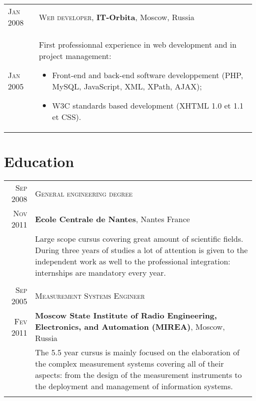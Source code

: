 \documentclass[letter,10pt]{article} %
\begin{document}
\begin{tabular}{R{2cm}|p{15.5cm}}

\textsc{Jan 2008} & \textsc{Web developer}, \normalsize\textbf{IT-Orbita},
Moscow, Russia \\
\textsc{Jan 2005} & \vspace{-1mm}First professionnal experience in web
development and in project management:
\begin{itemize}
\item Front-end and back-end software developpement (PHP, MySQL, JavaScript,
XML, XPath, AJAX);
\item W3C standards based development (XHTML 1.0 et 1.1 et CSS).
\end{itemize}\\

\end{tabular}

\newpage

\section{Education}

\begin{tabular}{r|p{15.5cm}}


\textsc{Sep 2008} & \textsc{General engineering degree} \\
\textsc{Nov 2011} & \normalsize\textbf{Ecole Centrale de Nantes}, Nantes
France \\
& Large scope cursus covering great amount of scientific fields. During three
years of studies a lot of attention is given to the independent work as well to the professional integration: internships are mandatory every year. \\
&\\



\textsc{Sep 2005} & \textsc{Measurement Systems Engineer} \\
\textsc{Fev 2011} & \normalsize\textbf{Moscow State Institute of Radio
Engineering, Electronics, and Automation (MIREA)}, Moscow, Russia  \\
& The 5.5 year cursus is mainly focused on the
elaboration of the complex measurement systems covering all of their aspects:
from the design of the measurement instruments to the deployment and
management of information systems.
\\
&\\
\end{tabular}
\end{document}
